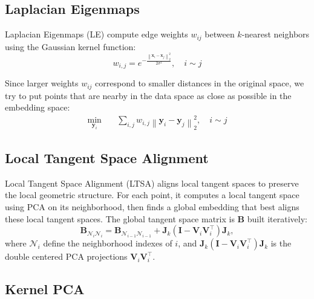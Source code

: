 \documentclass{article} %
\newcommand{\norm}[1]{\left\lVert#1\right\rVert}
\begin{document}
\subsection{Laplacian Eigenmaps}

Laplacian Eigenmaps (LE) \citep{le} compute edge weights $w_{ij}$ between $k$-nearest neighbors using the Gaussian kernel function:
\begin{equation}
    w_{i,j} = e^{-\frac{\norm{\bm{x}_{i}-\bm{x}_{j}}_{2}^{2}}{2\sigma^{2}}},\quad i\sim j
\end{equation}

Since larger weights $w_{ij}$ correspond to smaller distances in the original space, we try to put points that are nearby in the data space as close as possible in the embedding space:
\begin{align}
\min_{\bm{y}_{i}} \quad & \sum_{i,j}w_{i,j}\norm{\bm{y}_{i} - \bm{y}_{j}}_{2}^{2},\quad i\sim j
\end{align}

\subsection{Local Tangent Space Alignment}

Local Tangent Space Alignment (LTSA) \citep{ltsa} aligns local tangent spaces to preserve the local geometric structure. For each point, it computes a local tangent space using PCA on its neighborhood, then finds a global embedding that best aligns these local tangent spaces. The global tangent space matrix is $\bm{B}$ built iteratively:
\begin{equation}
    \bm{B}_{\mathcal{N}_i\mathcal{N}_i} = \bm{B}_{\mathcal{N}_{i-1}\mathcal{N}_{i-1}} + \bm{J}_k(\bm{I} - \bm{V}_i\bm{V}_i^\top)\bm{J}_k,
\end{equation}
where $\mathcal{N}_i$ define the neighborhood indexes of $i$, and $\bm{J}_k(\bm{I} - \bm{V}_i\bm{V}_i^\top)\bm{J}_k$ is the double centered PCA projections $\bm{V}_i\bm{V}_i^\top$. 


\subsection{Kernel PCA}
\end{document}
